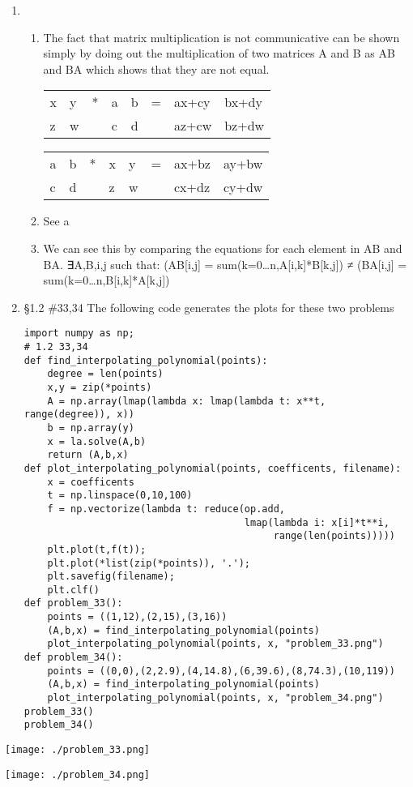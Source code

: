 \documentclass[11pt]{article}
\begin{document}
\begin{enumerate}
\item \begin{enumerate}
\item The fact that matrix multiplication is not communicative can be shown simply
by doing out the multiplication of two matrices A and B as AB and BA which
shows that they are not equal.
\begin{center}
\begin{tabular}{llllllll}
x & y & * & a & b & = & ax+cy & bx+dy\\
z & w &  & c & d &  & az+cw & bz+dw\\
\end{tabular}
\end{center}

\begin{center}
\begin{tabular}{llllllll}
a & b & * & x & y & = & ax+bz & ay+bw\\
c & d &  & z & w &  & cx+dz & cy+dw\\
\end{tabular}
\end{center}
\item See a
\item We can see this by comparing the equations for each element in AB and BA.
∃A,B,i,j such that:
(AB[i,j] = sum(k=0\ldots{}n,A[i,k]*B[k,j]) ≠ (BA[i,j] = sum(k=0\ldots{}n,B[i,k]*A[k,j])
\end{enumerate}
\item §1.2 \#33,34
The following code generates the plots for these two problems
\begin{verbatim}
import numpy as np;
# 1.2 33,34
def find_interpolating_polynomial(points):
    degree = len(points)
    x,y = zip(*points)
    A = np.array(lmap(lambda x: lmap(lambda t: x**t, range(degree)), x))
    b = np.array(y)
    x = la.solve(A,b)
    return (A,b,x)
def plot_interpolating_polynomial(points, coefficents, filename):
    x = coefficents
    t = np.linspace(0,10,100)
    f = np.vectorize(lambda t: reduce(op.add,
                                      lmap(lambda i: x[i]*t**i,
                                           range(len(points)))))
    plt.plot(t,f(t));
    plt.plot(*list(zip(*points)), '.');
    plt.savefig(filename);
    plt.clf()
def problem_33():
    points = ((1,12),(2,15),(3,16))
    (A,b,x) = find_interpolating_polynomial(points)
    plot_interpolating_polynomial(points, x, "problem_33.png")
def problem_34():
    points = ((0,0),(2,2.9),(4,14.8),(6,39.6),(8,74.3),(10,119))
    (A,b,x) = find_interpolating_polynomial(points)
    plot_interpolating_polynomial(points, x, "problem_34.png")
problem_33()
problem_34()
\end{verbatim}
\end{enumerate}
\begin{center}
\texttt{[image: ./problem\_33.png]}
\end{center}
\begin{center}
\texttt{[image: ./problem\_34.png]}
\end{center}
\end{document}
